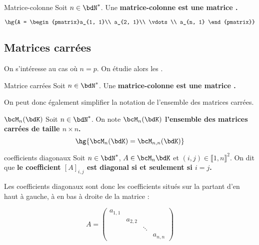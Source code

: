 \documentclass[a4paper,french,bookmarks]{article}
\begin{document}
\begin{definition}{Matrice-colonne}{}
     Soit $n \in \bdN^*$. Une \bf{matrice-colonne} est une matrice .
     
     \[ \hg{A = \begin{pmatrix}a_{1, 1}\\
     a_{2, 1}\\
     \vdots\\
     a_{n, 1}
     \end{pmatrix}}\]
\end{definition}

\subsection{Matrices carrées}

On s'intéresse au cas où $n = p$. On étudie alors les .

\begin{definition}{Matrice carrées}{}
     Soit $n \in \bdN^*$.  Une \bf{matrice-colonne} est une matrice .
\end{definition}

On peut donc également simplifier la notation de l'ensemble des matrices carrées.

\begin{definition}{$\bcM_n(\bdK)$}{}
    Soit $n \in \bdN^*$. On note \bf{$\bcM_n(\bdK)$ l'ensemble des matrices carrées} de taille $n \times n$.
     \[ \hg{\bcM_n(\bdK) = \bcM_{n, n}(\bdK)}\]
\end{definition}

\begin{definition}{coefficients diagonaux}{}
    Soit $n \in \bdN^*$, $A \in \bcM_n{\bdK}$ et $(i, j) \in \llbracket 1, n\rrbracket^2$. On dit que \bf{le coefficient $[A]_{i, j}$ est diagonal} si et seulement si $i = j$.
\end{definition}

Les coefficients diagonaux sont donc les coefficients situés sur la  partant d'en haut à gauche, à en bas à droite de la matrice :

\[ A = \begin{pmatrix}
    a_{1, 1} \\
    & a_{2, 2}\\
    & & \ddots\\
    & & & a_{n, n}
    \end{pmatrix} \]
\end{document}
